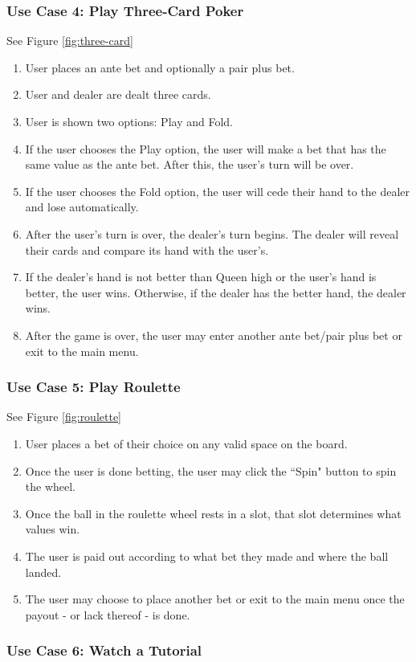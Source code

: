 \documentclass[10pt,conference,onecolumn,compsoc]{IEEEtran}
\begin{document}
\subsubsection{Use Case 4: Play Three-Card Poker}
See Figure \ref{fig:three-card}
\begin{enumerate}
\item User places an ante bet and optionally a pair plus bet.
\item User and dealer are dealt three cards.
\item User is shown two options: Play and Fold.
\item If the user chooses the Play option, the user will make a bet that has the same value as the ante bet. After this, the user's turn will be over.
\item If the user chooses the Fold option, the user will cede their hand to the dealer and lose automatically.
\item After the user's turn is over, the dealer's turn begins. The dealer will reveal their cards and compare its hand with the user's.
\item If the dealer's hand is not better than Queen high or the user's hand is better, the user wins. Otherwise, if the dealer has the better hand, the dealer wins.
\item After the game is over, the user may enter another ante bet/pair plus bet or exit to the main menu.
\end{enumerate}

\subsubsection{Use Case 5: Play Roulette}
See Figure \ref{fig:roulette}
\begin{enumerate}
\item User places a bet of their choice on any valid space on the board.
\item Once the user is done betting, the user may click the ``Spin" button to spin the wheel.
\item Once the ball in the roulette wheel rests in a slot, that slot determines what values win.
\item The user is paid out according to what bet they made and where the ball landed.
\item The user may choose to place another bet or exit to the main menu once the payout - or lack thereof - is done.
\end{enumerate}

\subsubsection{Use Case 6: Watch a Tutorial}
\end{document}
